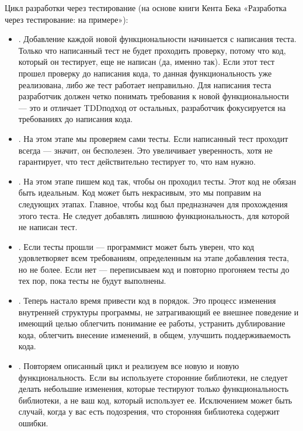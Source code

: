 \documentclass[letterpaper,10pt,russian]{sphinxmanual}
\begin{document}
\sphinxAtStartPar
Цикл разработки через тестирование (на основе книги Кента Бека «Разработка через тестирование: на примере»):
\begin{itemize}
\item {} 
\sphinxAtStartPar
{}. Добавление каждой новой функциональности начинается с написания теста. Только что написанный тест не будет проходить проверку, потому что код, который он тестирует, еще не написан (да, именно так). Если этот тест прошел проверку до написания кода, то данная функциональность уже реализована, либо же тест работает неправильно. Для написания теста разработчик должен четко понимать требования к новой функциональности — это и отличает TDD\sphinxhyphen{}подход от остальных, разработчик фокусируется на требованиях до написания кода.

\item {} 
\sphinxAtStartPar
{}. На этом этапе мы проверяем сами тесты. Если написанный тест проходит всегда — значит, он бесполезен. Это увеличивает уверенность, хотя не гарантирует, что тест действительно тестирует то, что нам нужно.

\item {} 
\sphinxAtStartPar
{}. На этом этапе пишем код так, чтобы он проходил тесты. Этот код не обязан быть идеальным. Код может быть некрасивым, это мы поправим на следующих этапах.  Главное, чтобы код был предназначен для прохождения этого теста. Не следует добавлять лишнюю функциональность, для которой не написан тест.

\item {} 
\sphinxAtStartPar
{}. Если тесты прошли — программист может быть уверен, что код удовлетворяет всем требованиям, определенным на этапе добавления теста, но не более. Если нет — переписываем код и повторно прогоняем тесты до тех пор, пока тесты не будут выполнены.

\item {} 
\sphinxAtStartPar
{}. Теперь настало время привести код в порядок. Это процесс изменения внутренней структуры программы, не затрагивающий ее внешнее поведение и имеющий целью облегчить понимание ее работы, устранить дублирование кода, облегчить внесение изменений, в общем, улучшить поддерживаемость кода.

\item {} 
\sphinxAtStartPar
{}. Повторяем описанный цикл и реализуем все новую и новую функциональность. Если вы используете сторонние библиотеки, не следует делать небольшие изменения, которые тестируют только функциональность библиотеки, а не ваш код, который использует ее. Исключением может быть случай, когда у вас есть подозрения, что сторонняя библиотека содержит ошибки.

\end{itemize}
\end{document}
